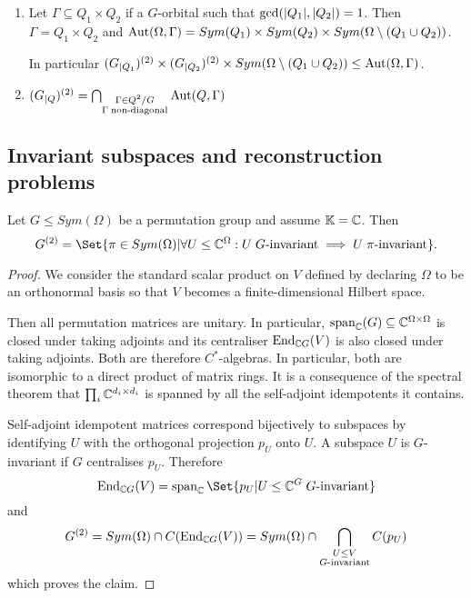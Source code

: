 \documentclass[fontsize=11pt,fleqn,a4paper]{scrartcl}
\begin{document}
\begin{lemma}
\begin{enumerate}
\item Let $\Gamma\subseteq Q_1\times Q_2$ if a $G$-orbital such that $\operatorname{gcd}(\lvert Q_1\rvert,\lvert Q_2\rvert)=1$. Then $\Gamma=Q_1\times Q_2$ and $\operatorname{Aut}(\Omega,\Gamma) = Sym(Q_1)\times Sym(Q_2) \times Sym(\Omega\setminus(Q_1\cup Q_2))$.

In particular $(G_{|Q_1})^{(2)} \times (G_{|Q_2})^{(2)} \times Sym(\Omega\setminus(Q_1\cup Q_2)) \leq \operatorname{Aut}(\Omega,\Gamma)$.

\item $(G_{|Q})^{(2)} = \bigcap_{\substack{\Gamma\in Q^2/G \\ \Gamma \;\text{non-diagonal}}} \operatorname{Aut}(Q,\Gamma)$
\end{enumerate}
\end{lemma}

\begin{algorithm}

\end{algorithm}

\subsection{Invariant subspaces and reconstruction problems}

\begin{theorem}\label{two_closure:in_terms_of_subspaces}
Let $G\leq Sym(\Omega)$ be a permutation group and assume $\mathbb{K}=\mathbb{C}$. Then
\[G^{(2)} = \Set{\pi\in Sym(\Omega) | \forall U\leq\IC^\Omega: U\;G\text{-invariant} \implies U\;\pi\text{-invariant}}.\]
\end{theorem}
\begin{proof}
We consider the standard scalar product on $V$ defined by declaring $\Omega$ to be an orthonormal basis so that $V$ becomes a finite-dimensional Hilbert space.

Then all permutation matrices are unitary. In particular, $\operatorname{span}_{\mathbb{C}}(G)\subseteq\mathbb{C}^{\Omega\times\Omega}$ is closed under taking adjoints and its centraliser $\operatorname{End}_{\mathbb{C} G}(V)$ is also closed under taking adjoints. Both are therefore $C^\ast$-algebras. In particular, both are isomorphic to a direct product of matrix rings. It is a consequence of the spectral theorem that $\prod_i \mathbb{C}^{d_i\times d_i}$ is spanned by all the self-adjoint idempotents it contains.

\medbreak
Self-adjoint idempotent matrices correspond bijectively to subspaces by identifying $U$ with the orthogonal projection $p_U$ onto $U$. A subspace $U$ is $G$-invariant if $G$ centralises $p_U$. Therefore
\[\End_{\IC G}(V) = \LinHull_\IC\Set{p_U | U\leq\IC^G\;G\text{-invariant}}\]
and
\[G^{(2)} = Sym(\Omega) \cap C(\operatorname{End}_{\mathbb{C} G}(V)) = Sym(\Omega) \cap \bigcap_{\substack{U\leq V \\ G\text{-invariant}}} C(p_U)\]
which proves the claim.
\end{proof}
\end{document}
